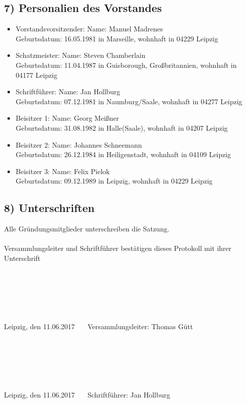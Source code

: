 \documentclass[10pt,a4paper]{scrartcl}
\begin{document}
\subsection*{7) Personalien des Vorstandes}
\begin{itemize}
\item Vorstandsvorsitzender:
    Name: Manuel Madrenes\\
	Geburtsdatum: 16.05.1981 in Marseille, wohnhaft in 04229 Leipzig
\item Schatzmeister:
    Name: Steven Chamberlain\\
	Geburtsdatum: 11.04.1987 in Guisborough, Gro{\ss}britannien, wohnhaft in 04177 Leipzig
\item Schriftf{\"u}hrer:
    Name: Jan Hollburg\\
    Geburtsdatum: 07.12.1981 in Naumburg/Saale, wohnhaft in 04277 Leipzig
\item Beisitzer 1:
	Name: Georg Mei{\ss}ner\\
	Geburtsdatum: 31.08.1982 in Halle(Saale), wohnhaft in 04207 Leipzig
\item Beisitzer 2:
	Name: Johannes Schneemann\\
	Geburtsdatum: 26.12.1984 in Heiligenstadt, wohnhaft in 04109 Leipzig
\item Beisitzer 3:
	Name: Felix Pielok\\
	Geburtsdatum: 09.12.1989 in Leipzig, wohnhaft in 04229 Leipzig
\end{itemize}

\subsection*{8) Unterschriften}
Alle Gr{\"u}ndungsmitglieder unterschreiben die Satzung.\\
\\
Versammlungsleiter und Schriftf{\"u}hrer best{\"a}tigen dieses Protokoll mit ihrer Unterschrift\\
\\
\\
\\
\\
\\
\\
Leipzig, den 11.06.2017 \ \ \ Versammlungsleiter: Thomas G{\"u}tt\\
\\
\\
\\
\\
\\
\\
Leipzig, den 11.06.2017 \ \ \ Schriftf{\"u}hrer: Jan Hollburg
\end{document}
